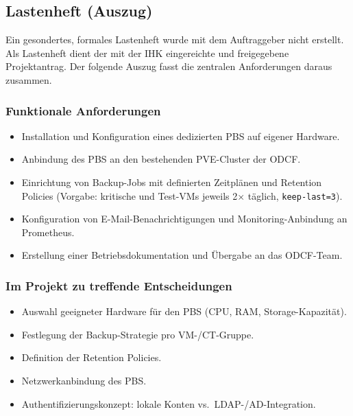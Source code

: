 \clearpage
\subsection{Lastenheft (Auszug)}
\label{app:Lastenheft}

Ein gesondertes, formales Lastenheft wurde mit dem Auftraggeber
nicht erstellt. Als Lastenheft dient der mit der \ac{IHK}
eingereichte und freigegebene Projektantrag. Der folgende Auszug
fasst die zentralen Anforderungen daraus zusammen.

\subsubsection*{Funktionale Anforderungen}
\begin{itemize}
    \item Installation und Konfiguration eines dedizierten
          \acl{PBS} auf eigener Hardware.
    \item Anbindung des \ac{PBS} an den bestehenden \ac{PVE}-Cluster
          der \ac{ODCF}.
    \item Einrichtung von Backup-Jobs mit definierten Zeitplänen
          und Retention Policies (Vorgabe: kritische und
          Test-\acp{VM} jeweils 2$\times$ täglich, \texttt{keep-last=3}).
    \item Konfiguration von E-Mail-Benachrichtigungen und
          Monitoring-Anbindung an Prometheus.
    \item Erstellung einer Betriebsdokumentation und Übergabe an
          das \ac{ODCF}-Team.
\end{itemize}

\subsubsection*{Im Projekt zu treffende Entscheidungen}
\begin{itemize}
    \item Auswahl geeigneter Hardware für den \ac{PBS}
          (CPU, \ac{RAM}, Storage-Kapazität).
    \item Festlegung der Backup-Strategie pro \ac{VM}-/\ac{CT}-Gruppe.
    \item Definition der Retention Policies.
    \item Netzwerkanbindung des \ac{PBS}.
    \item Authentifizierungskonzept: lokale Konten vs.\
          \ac{LDAP}-/\ac{AD}-Integration.
\end{itemize}

